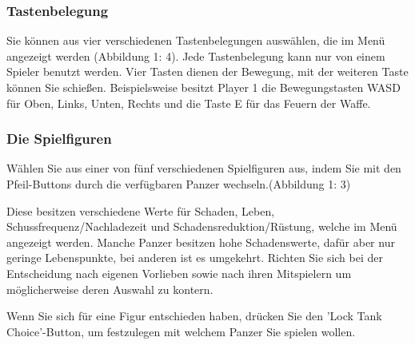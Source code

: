 \documentclass[a4paper]{scrartcl}
\begin{document}
\subsubsection{Tastenbelegung}
Sie können aus vier verschiedenen Tastenbelegungen auswählen, die im Menü angezeigt werden (Abbildung 1: 4). Jede Tastenbelegung kann nur von einem Spieler benutzt werden. Vier Tasten dienen der Bewegung, mit der weiteren Taste können Sie schießen. 
Beispielsweise besitzt Player 1 die Bewegungstasten WASD für Oben, Links, Unten, Rechts und die Taste E für das Feuern der Waffe.

\newpage
\subsubsection{Die Spielfiguren}
Wählen Sie aus einer von fünf verschiedenen Spielfiguren aus, indem Sie mit den Pfeil-Buttons durch die verfügbaren Panzer wechseln.(Abbildung 1: 3) 

Diese besitzen verschiedene Werte für Schaden, Leben, Schussfrequenz/Nachladezeit und Schadensreduktion/Rüstung, welche im Menü angezeigt werden. Manche Panzer besitzen hohe Schadenswerte, dafür aber nur geringe Lebenspunkte, bei anderen ist es umgekehrt. Richten Sie sich bei der Entscheidung nach eigenen Vorlieben sowie nach ihren Mitspielern um möglicherweise deren Auswahl zu kontern.


Wenn Sie sich für eine Figur entschieden haben, drücken Sie den 'Lock Tank Choice'-Button, um festzulegen mit welchem Panzer Sie spielen wollen.
\end{document}
